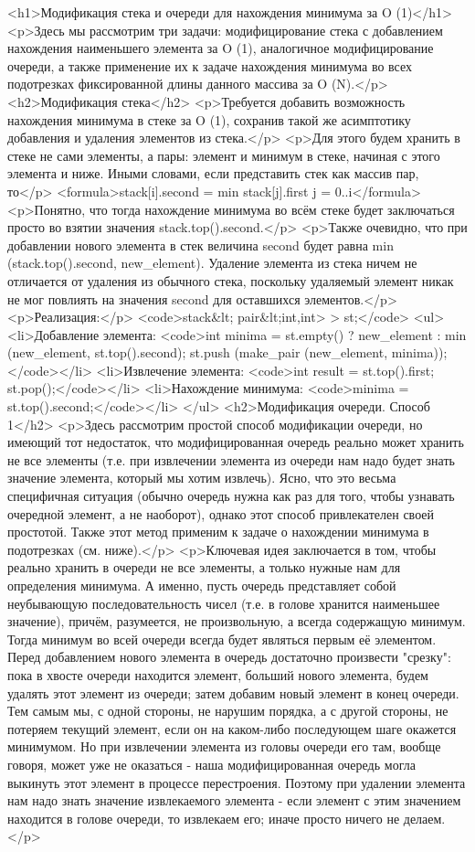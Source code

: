 <h1>Модификация стека и очереди для нахождения минимума за O (1)</h1>
<p>Здесь мы рассмотрим три задачи: модифицирование стека с добавлением нахождения наименьшего элемента за O (1), аналогичное модифицирование очереди, а также применение их к задаче нахождения минимума во всех подотрезках фиксированной длины данного массива за O (N).</p>
<h2>Модификация стека</h2>
<p>Требуется добавить возможность нахождения минимума в стеке за O (1), сохранив такой же асимптотику добавления и удаления элементов из стека.</p>
<p>Для этого будем хранить в стеке не сами элементы, а пары: элемент и минимум в стеке, начиная с этого элемента и ниже. Иными словами, если представить стек как массив пар, то</p>
<formula>stack[i].second = min { stack[j].first }
                 j = 0..i</formula>
<p>Понятно, что тогда нахождение минимума во всём стеке будет заключаться просто во взятии значения stack.top().second.</p>
<p>Также очевидно, что при добавлении нового элемента в стек величина second будет равна min (stack.top().second, new_element). Удаление элемента из стека ничем не отличается от удаления из обычного стека, поскольку удаляемый элемент никак не мог повлиять на значения second для оставшихся элементов.</p>
<p>Реализация:</p>
<code>stack&lt; pair&lt;int,int> > st;</code>
<ul>
<li>Добавление элемента:
<code>int minima = st.empty() ? new_element : min (new_element, st.top().second);
st.push (make_pair (new_element, minima));</code></li>
<li>Извлечение элемента:
<code>int result = st.top().first;
st.pop();</code></li>
<li>Нахождение минимума:
<code>minima = st.top().second;</code></li>
</ul>
<h2>Модификация очереди. Способ 1</h2>
<p>Здесь рассмотрим простой способ модификации очереди, но имеющий тот недостаток, что модифицированная очередь реально может хранить не все элементы (т.е. при извлечении элемента из очереди нам надо будет знать значение элемента, который мы хотим извлечь). Ясно, что это весьма специфичная ситуация (обычно очередь нужна как раз для того, чтобы узнавать очередной элемент, а не наоборот), однако этот способ привлекателен своей простотой. Также этот метод применим к задаче о нахождении минимума в подотрезках (см. ниже).</p>
<p>Ключевая идея заключается в том, чтобы реально хранить в очереди не все элементы, а только нужные нам для определения минимума. А именно, пусть очередь представляет собой неубывающую последовательность чисел (т.е. в голове хранится наименьшее значение), причём, разумеется, не произвольную, а всегда содержащую минимум. Тогда минимум во всей очереди всегда будет являться первым её элементом. Перед добавлением нового элемента в очередь достаточно произвести "срезку": пока в хвосте очереди находится элемент, больший нового элемента, будем удалять этот элемент из очереди; затем добавим новый элемент в конец очереди. Тем самым мы, с одной стороны, не нарушим порядка, а с другой стороны, не потеряем текущий элемент, если он на каком-либо последующем шаге окажется минимумом. Но при извлечении элемента из головы очереди его там, вообще говоря, может уже не оказаться - наша модифицированная очередь могла выкинуть этот элемент в процессе перестроения. Поэтому при удалении элемента нам надо знать значение извлекаемого элемента - если элемент с этим значением находится в голове очереди, то извлекаем его; иначе просто ничего не делаем.</p>
